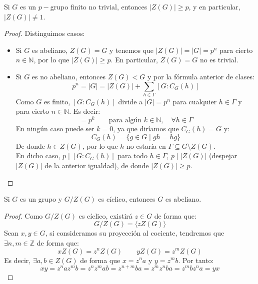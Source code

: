 \begin{teo}[de Burnside]
    Si $G$ es un $p-$grupo finito no trivial, entonces \newline $|Z(G)| \geq p$, y en particular, $|Z(G)| \neq 1$.
    \begin{proof}
        Distinguimos casos:
        \begin{itemize}
            \item Si $G$ es abeliano, $Z(G) = G$ y tenemos que $|Z(G)| = |G| = p^n$ para cierto $n\in \mathbb{N}$, por lo que $|Z(G)| \geq p$. En particular, $Z(G) = G$ no es trivial.
            \item Si $G$ es no abeliano, entonces $Z(G) < G$ y por la fórmula anterior de clases:
                \begin{equation*}
                    p^n = |G| = |Z(G)| + \sum_{h\in \Gamma} [G:C_G(h)]
                \end{equation*}
                Como $G$ es finito, $[G:C_G(h)]$ divide a $|G| = p^n$ para cualquier $h\in \Gamma$ y para cierto $n\in \mathbb{N}$. Es decir:
                \begin{equation*}
                    [G:C_G(h)] = p^k \qquad \text{para algún\ } k\in \mathbb{N}, \quad \forall h\in\Gamma
                \end{equation*}
                En ningún caso puede ser $k = 0$, ya que diríamos que $C_G(h) = G$ y:
                \begin{equation*}
                    C_G(h) = \{g\in G \mid gh=hg\}
                \end{equation*}
                De donde $h\in Z(G)$, por lo que $h$ no estaría en $\Gamma\subseteq G\setminus Z(G)$.\\

                \noindent
                En dicho caso, $p\mid [G:C_G(h)]$ para todo $h\in \Gamma$, $p\mid |Z(G)|$ (despejar $|Z(G)|$ de la anterior igualdad), de donde $|Z(G)| \geq p$.
        \end{itemize}
    \end{proof}
\end{teo}

\begin{lema}
    Si $G$ es un grupo y $G/Z(G)$ es cíclico, entonces $G$ es abeliano.
    \begin{proof}
        Como $G/Z(G)$ es cíclico, existirá $z\in G$ de forma que:
        \begin{equation*}
            G/Z(G) = \langle zZ(G) \rangle 
        \end{equation*}
        Sean $x,y\in G$, si consideramos su proyección al cociente, tendremos que $\exists n,m\in \mathbb{Z}$ de forma que:
        \begin{equation*}
            xZ(G) = z^nZ(G) \qquad yZ(G) = z^mZ(G)
        \end{equation*}
        Es decir, $\exists a,b\in Z(G)$ de forma que $x = z^na$ y $y = z^mb$. Por tanto:
        \begin{equation*}
            xy = z^naz^mb = z^nz^mab = z^{n+m}ba = z^mz^nba = z^mbz^na = yx
        \end{equation*}
    \end{proof}
\end{lema}

